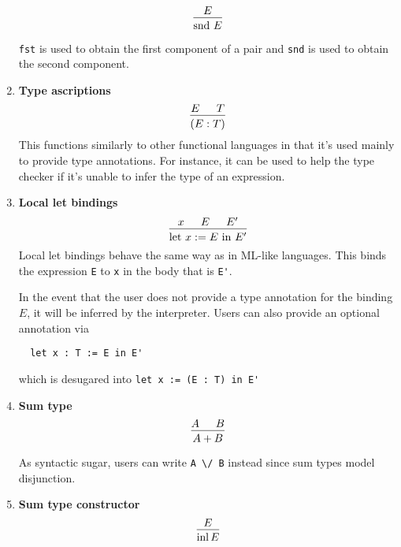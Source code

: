 \documentclass{article}
\begin{document}
\begin{enumerate}
  \[
   \begin{prooftree}
    \hypo{E}
    \infer1{\snd \, E}
   \end{prooftree}
 \]

 \verb|fst| is used to obtain the first component of a pair and \verb|snd| is used
 to obtain the second component.

\item \textbf{Type ascriptions} \\
  \[
    \begin{prooftree}
      \hypo{E}
      \hypo{T}
      \infer2{(E : T)}
    \end{prooftree}
  \]
  This functions similarly to other functional languages in that it's used
  mainly to provide type annotations. For instance, it can be used to help the
  type checker if it's unable to infer the type of an expression.

\item \textbf{Local let bindings} \\
\[
  \begin{prooftree}
    \hypo{x}
    \hypo{E}
    \hypo{E'}
    \infer3{\text{let } x := E \text{ in } E'}
  \end{prooftree}
\]
Local let bindings behave the same way as in ML-like languages.
This binds the expression \verb|E| to \verb|x| in the body that is \verb|E'|.

In the event that the user does not provide a type annotation for the binding
$E$, it will be inferred by the interpreter. Users can also provide an optional
annotation via
\begin{verbatim}
  let x : T := E in E'
\end{verbatim}

which is desugared into \verb|let x := (E : T) in E'|

\item \textbf{Sum type} \\
\[
  \begin{prooftree}
    \hypo{A}
    \hypo{B}
    \infer2{A + B}
  \end{prooftree}
\]

As syntactic sugar, users can write \verb|A \/ B| instead since sum types
model disjunction.

\item \textbf{Sum type constructor} \\
\[
  \begin{prooftree}
    \hypo{E}
    \infer1{\inl E}
  \end{prooftree}
\]


\end{enumerate}
\end{document}
